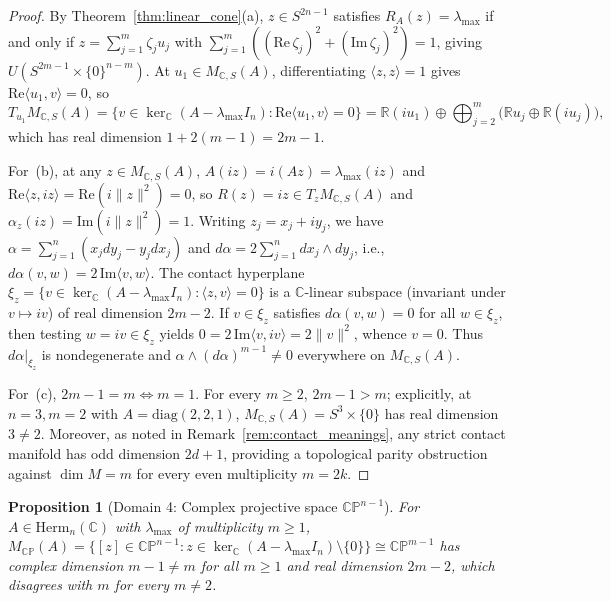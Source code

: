 \documentclass[11pt,a4paper]{article}
\newtheorem{proposition}[theorem]{Proposition}
\theoremstyle{definition}
\theoremstyle{remark}
\newcommand{\RR}{\mathbb{R}}
\newcommand{\CC}{\mathbb{C}}
\newcommand{\CP}{\mathbb{CP}}
\newcommand{\Herm}{\mathrm{Herm}}
\newcommand{\diag}{\mathrm{diag}}
\newcommand{\im}{\mathrm{Im}}
\newcommand{\re}{\mathrm{Re}}
\begin{document}
\begin{proof}
By Theorem~\ref{thm:linear_cone}(a), $z \in S^{2n-1}$ satisfies $R_A(z) = \lambda_{\max}$ if and only if $z = \sum_{j=1}^m \zeta_j u_j$ with $\sum_{j=1}^m ((\re\,\zeta_j)^2 + (\im\,\zeta_j)^2) = 1$, giving $U(S^{2m-1} \times \{0\}^{n-m})$. At $u_1 \in M_{\CC, S}(A)$, differentiating $\langle z, z \rangle = 1$ gives $\re\langle u_1, v \rangle = 0$, so
\[
  T_{u_1} M_{\CC, S}(A) = \{v \in \ker_{\CC}(A - \lambda_{\max} I_n) : \re\langle u_1, v \rangle = 0\}
  = \RR (i u_1) \oplus \bigoplus_{j=2}^m \bigl(\RR u_j \oplus \RR(i u_j)\bigr),
\]
which has real dimension $1 + 2(m - 1) = 2m - 1$.

For~(b), at any $z \in M_{\CC, S}(A)$, $A(i z) = i (A z) = \lambda_{\max}(i z)$ and $\re\langle z, i z \rangle = \re(i \|z\|^2) = 0$, so $R(z) = i z \in T_z M_{\CC, S}(A)$ and $\alpha_z(i z) = \im(i \|z\|^2) = 1$. Writing $z_j = x_j + i y_j$, we have $\alpha = \sum_{j=1}^n (x_j dy_j - y_j dx_j)$ and $d\alpha = 2 \sum_{j=1}^n dx_j \wedge dy_j$, i.e., $d\alpha(v, w) = 2\,\im\langle v, w \rangle$. The contact hyperplane $\xi_z = \{v \in \ker_{\CC}(A - \lambda_{\max} I_n) : \langle z, v \rangle = 0\}$ is a $\CC$-linear subspace (invariant under $v \mapsto i v$) of real dimension $2m - 2$. If $v \in \xi_z$ satisfies $d\alpha(v, w) = 0$ for all $w \in \xi_z$, then testing $w = i v \in \xi_z$ yields $0 = 2\,\im\langle v, i v \rangle = 2\|v\|^2$, whence $v = 0$. Thus $d\alpha|_{\xi_z}$ is nondegenerate and $\alpha \wedge (d\alpha)^{m-1} \neq 0$ everywhere on $M_{\CC, S}(A)$.

For~(c), $2m - 1 = m \iff m = 1$. For every $m \ge 2$, $2m - 1 > m$; explicitly, at $n = 3, m = 2$ with $A = \diag(2, 2, 1)$, $M_{\CC, S}(A) = S^3 \times \{0\}$ has real dimension $3 \neq 2$. Moreover, as noted in Remark~\ref{rem:contact_meanings}, any strict contact manifold has odd dimension $2d + 1$, providing a topological parity obstruction against $\dim M = m$ for every even multiplicity $m = 2k$.
\end{proof}

\begin{proposition}[Domain 4: Complex projective space $\CP^{n-1}$]
\label{prop:complex_proj}
For $A \in \Herm_n(\CC)$ with $\lambda_{\max}$ of multiplicity $m \ge 1$, $M_{\CP}(A) = \{[z] \in \CP^{n-1} : z \in \ker_{\CC}(A - \lambda_{\max} I_n) \setminus \{0\}\} \cong \CP^{m-1}$ has complex dimension $m - 1 \neq m$ for all $m \ge 1$ and real dimension $2m - 2$, which disagrees with $m$ for every $m \neq 2$.
\end{proposition}
\end{document}
